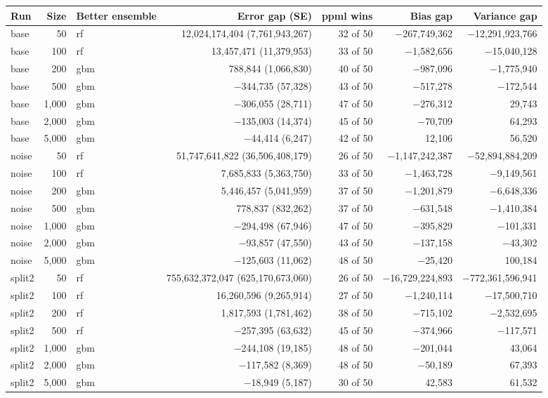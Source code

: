 \begin{tabular}{lrlrrrr}
\toprule
Run & Size & Better ensemble & Error gap (SE) & ppml wins & Bias gap & Variance gap \\
\midrule
base & 50 & rf & 12,024,174,404 (7,761,943,267) & 32 of 50 & $-$267,749,362 & $-$12,291,923,766 \\
base & 100 & rf & 13,457,471 (11,379,953) & 33 of 50 & $-$1,582,656 & $-$15,040,128 \\
base & 200 & gbm & 788,844 (1,066,830) & 40 of 50 & $-$987,096 & $-$1,775,940 \\
base & 500 & gbm & $-$344,735 (57,328) & 43 of 50 & $-$517,278 & $-$172,544 \\
base & 1,000 & gbm & $-$306,055 (28,711) & 47 of 50 & $-$276,312 & 29,743 \\
base & 2,000 & gbm & $-$135,003 (14,374) & 45 of 50 & $-$70,709 & 64,293 \\
base & 5,000 & gbm & $-$44,414 (6,247) & 42 of 50 & 12,106 & 56,520 \\
noise & 50 & rf & 51,747,641,822 (36,506,408,179) & 26 of 50 & $-$1,147,242,387 & $-$52,894,884,209 \\
noise & 100 & rf & 7,685,833 (5,363,750) & 33 of 50 & $-$1,463,728 & $-$9,149,561 \\
noise & 200 & gbm & 5,446,457 (5,041,959) & 37 of 50 & $-$1,201,879 & $-$6,648,336 \\
noise & 500 & gbm & 778,837 (832,262) & 37 of 50 & $-$631,548 & $-$1,410,384 \\
noise & 1,000 & gbm & $-$294,498 (67,946) & 47 of 50 & $-$395,829 & $-$101,331 \\
noise & 2,000 & gbm & $-$93,857 (47,550) & 43 of 50 & $-$137,158 & $-$43,302 \\
noise & 5,000 & gbm & $-$125,603 (11,062) & 48 of 50 & $-$25,420 & 100,184 \\
split2 & 50 & rf & 755,632,372,047 (625,170,673,060) & 26 of 50 & $-$16,729,224,893 & $-$772,361,596,941 \\
split2 & 100 & rf & 16,260,596 (9,265,914) & 27 of 50 & $-$1,240,114 & $-$17,500,710 \\
split2 & 200 & rf & 1,817,593 (1,781,462) & 38 of 50 & $-$715,102 & $-$2,532,695 \\
split2 & 500 & rf & $-$257,395 (63,632) & 45 of 50 & $-$374,966 & $-$117,571 \\
split2 & 1,000 & gbm & $-$244,108 (19,185) & 48 of 50 & $-$201,044 & 43,064 \\
split2 & 2,000 & gbm & $-$117,582 (8,369) & 48 of 50 & $-$50,189 & 67,393 \\
split2 & 5,000 & gbm & $-$18,949 (5,187) & 30 of 50 & 42,583 & 61,532 \\
\bottomrule
\end{tabular}
